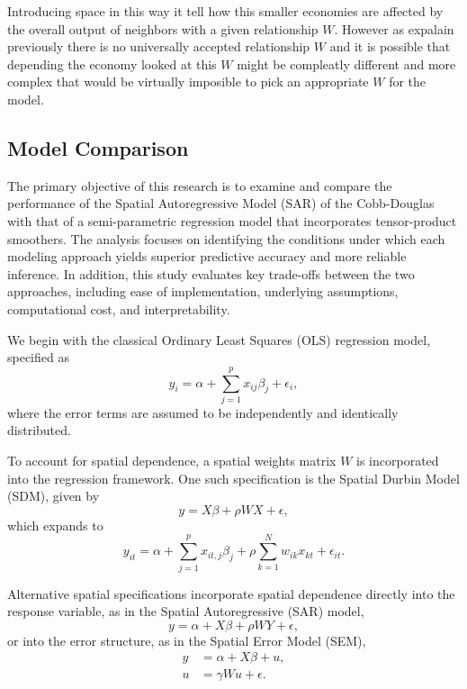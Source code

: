 \documentclass{article}
\begin{document}
Introducing space in this way it tell how this smaller economies are affected by the
overall output of neighbors with a given relationship $W$. However as expalain previously
there is no universally accepted relationship $W$ and it is possible that depending the
economy looked at this $W$ might be compleatly different and more complex that would be virtually
imposible to pick an appropriate $W$ for the model.


\subsection{Model Comparison}

The primary objective of this research is to examine and compare the performance
of the Spatial Autoregressive Model (SAR) of the Cobb-Douglas with that of a semi-parametric regression model
that incorporates tensor-product smoothers. The analysis focuses on identifying
the conditions under which each modeling approach yields superior predictive
accuracy and more reliable inference. In addition, this study evaluates key
trade-offs between the two approaches, including ease of implementation,
underlying assumptions, computational cost, and interpretability.




We begin with the classical Ordinary Least Squares (OLS) regression model,
specified as
\begin{equation}
	y_i = \alpha + \sum_{j=1}^{p} x_{ij}\beta_j + \epsilon_i,
	\label{eq:OLS}
\end{equation}
where the error terms are assumed to be independently and identically
distributed.

To account for spatial dependence, a spatial weights matrix $W$ is incorporated
into the regression framework. One such specification is the Spatial Durbin
Model (SDM), given by
\begin{equation}
	y = X\beta + \rho WX + \epsilon,
	\label{eq:SDM}
\end{equation}
which expands to
\begin{equation}
	y_{it}
	=
	\alpha
	+ \sum_{j=1}^{p} x_{it,j}\beta_j
	+ \rho \sum_{k=1}^{N} w_{ik} x_{kt}
	+ \epsilon_{it}.
	\label{eq:SDM_exp}
\end{equation}

Alternative spatial specifications incorporate spatial dependence directly into
the response variable, as in the Spatial Autoregressive (SAR) model,
\begin{equation}
	y = \alpha + X\beta + \rho WY + \epsilon,
	\label{eq:SAR}
\end{equation}
or into the error structure, as in the Spatial Error Model (SEM),
\begin{equation}
	\begin{split}
		y & = \alpha + X\beta + u,  \\
		u & = \gamma Wu + \epsilon.
	\end{split}
	\label{eq:SEM}
\end{equation}
\end{document}
